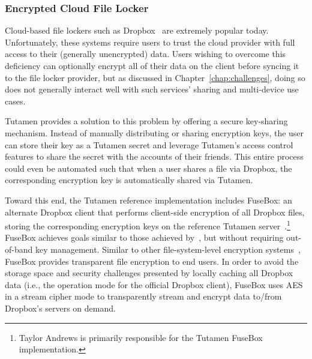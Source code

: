 \subsubsection{Encrypted Cloud File Locker}

Cloud-based file lockers such as Dropbox~\cite{dropbox} are extremely
popular today. Unfortunately, these systems require users to trust the
cloud provider with full access to their (generally unencrypted)
data. Users wishing to overcome this deficiency can optionally encrypt
all of their data on the client before syncing it to the file locker
provider, but as discussed in Chapter~\ref{chap:challenges}, doing so
does not generally interact well with such services' sharing and
multi-device use cases.

Tutamen provides a solution to this problem by offering a secure
key-sharing mechanism. Instead of manually distributing or sharing
encryption keys, the user can store their key as a Tutamen secret and
leverage Tutamen's access control features to share the secret with
the accounts of their friends. This entire process could even be
automated such that when a user shares a file via Dropbox, the
corresponding encryption key is automatically shared via Tutamen.

Toward this end, the Tutamen reference implementation includes
FuseBox: an alternate Dropbox client that performs client-side
encryption of all Dropbox files, storing the corresponding encryption
keys on the reference Tutamen server~\cite{fusebox}.\footnote{Taylor
  Andrews is primarily responsible for the Tutamen FuseBox
  implementation.} FuseBox achieves goals similar to those achieved
by~\cite{goh2003}, but without requiring out-of-band key
management. Similar to other file-system-level encryption
systems~\cite{blaze1993, Cattaneo2001, halcrow}, FuseBox provides
transparent file encryption to end users. In order to avoid the
storage space and security challenges presented by locally caching all
Dropbox data (i.e., the operation mode for the official Dropbox
client), FuseBox uses AES~\cite{daemen1999, nist2001} in a stream
cipher mode to transparently stream and encrypt data to/from
Dropbox's servers on demand.

